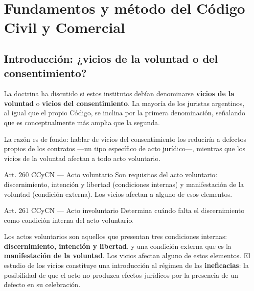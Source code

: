 \documentclass[12pt,oneside]{book}
\begin{document}
\mainmatter

\chapter{Fundamentos y método del Código Civil y Comercial}

\section{Introducción: ¿vicios de la voluntad o del consentimiento?}

La doctrina ha discutido si estos institutos debían denominarse \textbf{vicios de la voluntad} o \textbf{vicios del consentimiento}. La mayoría de los juristas argentinos, al igual que el propio Código, se inclina por la primera denominación, señalando que es conceptualmente más amplia que la segunda.

La razón es de fondo: hablar de vicios del consentimiento los reduciría a defectos propios de los contratos ---un tipo específico de acto jurídico---, mientras que los vicios de la voluntad afectan a todo acto voluntario.

\begin{articulo}{Art. 260 CCyCN --- Acto voluntario}
Son requisitos del acto voluntario: discernimiento, intención y libertad (condiciones internas) y manifestación de la voluntad (condición externa). Los vicios afectan a alguno de esos elementos.
\end{articulo}

\begin{articulo}{Art. 261 CCyCN --- Acto involuntario}
Determina cuándo falta el discernimiento como condición interna del acto voluntario.
\end{articulo}

Los actos voluntarios son aquellos que presentan tres condiciones internas: \textbf{discernimiento, intención y libertad}, y una condición externa que es la \textbf{manifestación de la voluntad}. Los vicios afectan alguno de estos elementos. El estudio de los vicios constituye una introducción al régimen de las \textbf{ineficacias}: la posibilidad de que el acto no produzca efectos jurídicos por la presencia de un defecto en su celebración.
\end{document}
